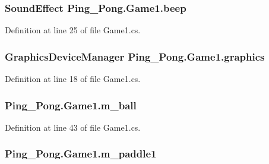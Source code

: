 \hypertarget{class_ping___pong_1_1_game1_aaa0f5f32149b8eb6abd8c148a4e47c36}{
\subsubsection[{beep}]{\setlength{\rightskip}{0pt plus 5cm}Sound\-Effect Ping\-\_\-\-Pong.\-Game1.\-beep\hspace{0.3cm}{\ttfamily [private]}}}\label{class_ping___pong_1_1_game1_aaa0f5f32149b8eb6abd8c148a4e47c36}


Definition at line 25 of file Game1.\-cs.

\hypertarget{class_ping___pong_1_1_game1_aaaff77331c3e33fc32f14a28fa530a7d}{
\subsubsection[{graphics}]{\setlength{\rightskip}{0pt plus 5cm}Graphics\-Device\-Manager Ping\-\_\-\-Pong.\-Game1.\-graphics\hspace{0.3cm}{\ttfamily [private]}}}\label{class_ping___pong_1_1_game1_aaaff77331c3e33fc32f14a28fa530a7d}


Definition at line 18 of file Game1.\-cs.

\hypertarget{class_ping___pong_1_1_game1_a3da763dfe56d5444101a2a3c2ea97389}{
\subsubsection[{m\-\_\-ball}]{ Ping\-\_\-\-Pong.\-Game1.\-m\-\_\-ball\hspace{0.3cm}{\ttfamily [private]}}}\label{class_ping___pong_1_1_game1_a3da763dfe56d5444101a2a3c2ea97389}


Definition at line 43 of file Game1.\-cs.

\hypertarget{class_ping___pong_1_1_game1_ac47e2989a6e169d42af4366f901c3d8a}{
\subsubsection[{m\-\_\-paddle1}]{ Ping\-\_\-\-Pong.\-Game1.\-m\-\_\-paddle1\hspace{0.3cm}{\ttfamily [private]}}}\label{class_ping___pong_1_1_game1_ac47e2989a6e169d42af4366f901c3d8a}


